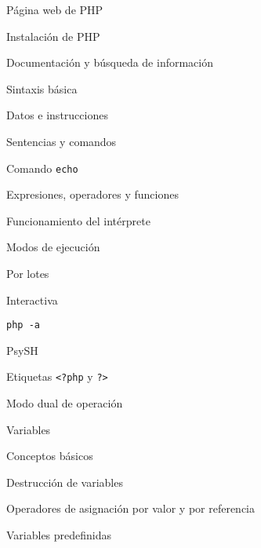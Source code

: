 \begin{longenum}
\begin{longenum}
        \begin{longenum}
            \item Página web de PHP
            \item Instalación de PHP
            \item Documentación y búsqueda de información
        \end{longenum}
        \item Sintaxis básica
        \begin{longenum}
            \item Datos e instrucciones
            \item Sentencias y comandos
            \begin{longenum}
                \item Comando \texttt{echo}
            \end{longenum}
            \item Expresiones, operadores y funciones
        \end{longenum}
        \item Funcionamiento del intérprete
        \begin{longenum}
            \item Modos de ejecución
            \begin{longenum}
                \item Por lotes
                \item Interactiva
                \begin{longenum}
                    \item \texttt{php -a}
                    \item PsySH
                \end{longenum}
            \end{longenum}
            \item Etiquetas \texttt{<?php} y \texttt{?>}
            \item Modo dual de operación
        \end{longenum}
        \item Variables
        \begin{longenum}
            \item Conceptos básicos
            \item Destrucción de variables
            \item Operadores de asignación por valor y por referencia
            \item Variables predefinidas
        \end{longenum}

\end{longenum}
\end{longenum}
